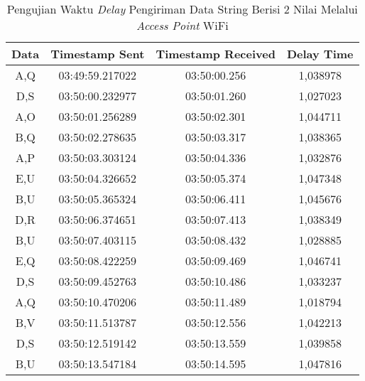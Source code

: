\begin{longtable}{|ccc|c|}
  \caption{Pengujian Waktu \emph{Delay} Pengiriman Data String Berisi 2 Nilai Melalui \emph{Access Point} WiFi}
  \label{tbl:delayWiFi2}\\
  \hline
  \multicolumn{1}{|c|}{Data} & \multicolumn{1}{c|}{Timestamp Sent}  & Timestamp Received & Delay Time  \\ \hline
  \endfirsthead
  \endhead
  \multicolumn{1}{|c|}{A,Q}  & \multicolumn{1}{c|}{03:49:59.217022} & 03:50:00.256       & 1,038978    \\ \hline
  \multicolumn{1}{|c|}{D,S}  & \multicolumn{1}{c|}{03:50:00.232977} & 03:50:01.260       & 1,027023    \\ \hline
  \multicolumn{1}{|c|}{A,O}  & \multicolumn{1}{c|}{03:50:01.256289} & 03:50:02.301       & 1,044711    \\ \hline
  \multicolumn{1}{|c|}{B,Q}  & \multicolumn{1}{c|}{03:50:02.278635} & 03:50:03.317       & 1,038365    \\ \hline
  \multicolumn{1}{|c|}{A,P}  & \multicolumn{1}{c|}{03:50:03.303124} & 03:50:04.336       & 1,032876    \\ \hline
  \multicolumn{1}{|c|}{E,U}  & \multicolumn{1}{c|}{03:50:04.326652} & 03:50:05.374       & 1,047348    \\ \hline
  \multicolumn{1}{|c|}{B,U}  & \multicolumn{1}{c|}{03:50:05.365324} & 03:50:06.411       & 1,045676    \\ \hline
  \multicolumn{1}{|c|}{D,R}  & \multicolumn{1}{c|}{03:50:06.374651} & 03:50:07.413       & 1,038349    \\ \hline
  \multicolumn{1}{|c|}{B,U}  & \multicolumn{1}{c|}{03:50:07.403115} & 03:50:08.432       & 1,028885    \\ \hline
  \multicolumn{1}{|c|}{E,Q}  & \multicolumn{1}{c|}{03:50:08.422259} & 03:50:09.469       & 1,046741    \\ \hline
  \multicolumn{1}{|c|}{D,S}  & \multicolumn{1}{c|}{03:50:09.452763} & 03:50:10.486       & 1,033237    \\ \hline
  \multicolumn{1}{|c|}{A,Q}  & \multicolumn{1}{c|}{03:50:10.470206} & 03:50:11.489       & 1,018794    \\ \hline
  \multicolumn{1}{|c|}{B,V}  & \multicolumn{1}{c|}{03:50:11.513787} & 03:50:12.556       & 1,042213    \\ \hline
  \multicolumn{1}{|c|}{D,S}  & \multicolumn{1}{c|}{03:50:12.519142} & 03:50:13.559       & 1,039858    \\ \hline
  \multicolumn{1}{|c|}{B,U}  & \multicolumn{1}{c|}{03:50:13.547184} & 03:50:14.595       & 1,047816    \\ \hline

\end{longtable}
